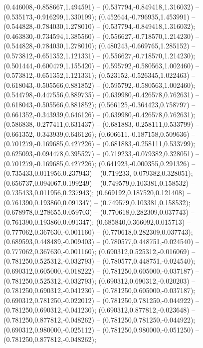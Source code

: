  (0.446008,-0.858667,1.494591) -- (0.537794,-0.849418,1.316032) -- (0.535173,-0.916299,1.330199);
 (0.452644,-0.796935,1.453991) -- (0.544828,-0.784030,1.278010) -- (0.537794,-0.849418,1.316032);
 (0.463830,-0.734594,1.385560) -- (0.556627,-0.718570,1.214230) -- (0.544828,-0.784030,1.278010);
 (0.480243,-0.669765,1.285152) -- (0.573812,-0.651352,1.121331) -- (0.556627,-0.718570,1.214230);
 (0.501444,-0.600479,1.155420) -- (0.595792,-0.580563,1.002460) -- (0.573812,-0.651352,1.121331);
 (0.523152,-0.526345,1.022463) -- (0.618043,-0.505566,0.881852) -- (0.595792,-0.580563,1.002460);
 (0.544798,-0.447556,0.889735) -- (0.639980,-0.426578,0.762631) -- (0.618043,-0.505566,0.881852);
 (0.566125,-0.364423,0.758797) -- (0.661352,-0.343939,0.646126) -- (0.639980,-0.426578,0.762631);
 (0.586838,-0.277411,0.631437) -- (0.681883,-0.258111,0.533799) -- (0.661352,-0.343939,0.646126);
 (0.606611,-0.187158,0.509636) -- (0.701279,-0.169685,0.427226) -- (0.681883,-0.258111,0.533799);
 (0.625093,-0.094478,0.395527) -- (0.719233,-0.079382,0.328051) -- (0.701279,-0.169685,0.427226);
 (0.641923,-0.000355,0.291326) -- (0.735433,0.011956,0.237943) -- (0.719233,-0.079382,0.328051);
 (0.656737,0.094067,0.199249) -- (0.749579,0.103381,0.158532) -- (0.735433,0.011956,0.237943);
 (0.669192,0.187520,0.121408) -- (0.761390,0.193860,0.091347) -- (0.749579,0.103381,0.158532);
 (0.678978,0.278655,0.059703) -- (0.770618,0.282309,0.037743) -- (0.761390,0.193860,0.091347);
 (0.685840,0.366092,0.015713) -- (0.777062,0.367630,-0.001160) -- (0.770618,0.282309,0.037743);
 (0.689593,0.448489,-0.009403) -- (0.780577,0.448751,-0.024540) -- (0.777062,0.367630,-0.001160);
 (0.690312,0.525312,-0.016069) -- (0.781250,0.525312,-0.032793) -- (0.780577,0.448751,-0.024540);
 (0.690312,0.605000,-0.018222) -- (0.781250,0.605000,-0.037187) -- (0.781250,0.525312,-0.032793);
 (0.690312,0.690312,-0.020203) -- (0.781250,0.690312,-0.041230) -- (0.781250,0.605000,-0.037187);
 (0.690312,0.781250,-0.022012) -- (0.781250,0.781250,-0.044922) -- (0.781250,0.690312,-0.041230);
 (0.690312,0.877812,-0.023648) -- (0.781250,0.877812,-0.048262) -- (0.781250,0.781250,-0.044922);
 (0.690312,0.980000,-0.025112) -- (0.781250,0.980000,-0.051250) -- (0.781250,0.877812,-0.048262);

